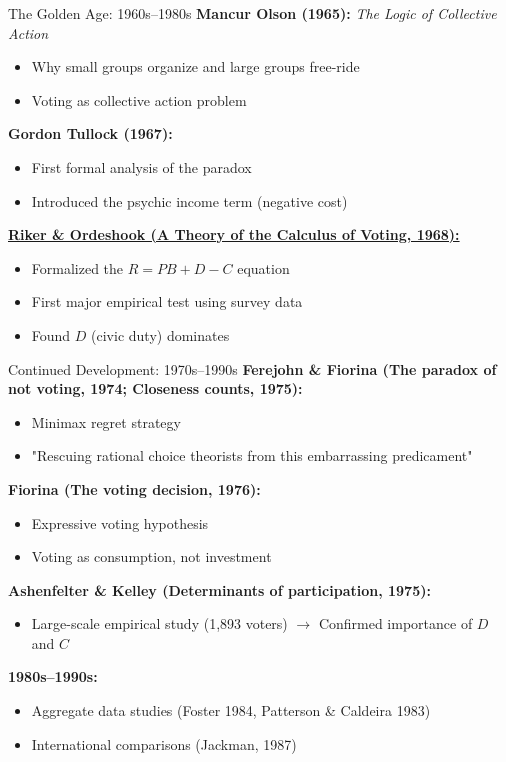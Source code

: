 \documentclass[10pt]{beamer}
\begin{document}
\begin{frame}{The Golden Age: 1960s--1980s}
\textbf{Mancur Olson (1965):} \emph{The Logic of Collective Action}
\begin{itemize}
\item Why small groups organize and large groups free-ride
\item Voting as collective action problem
\end{itemize}


\textbf{Gordon Tullock (1967):}
\begin{itemize}
\item First formal analysis of the paradox
\item Introduced the psychic income term (negative cost)
\end{itemize}

\href{https://www.cambridge.org/core/journals/american-political-science-review/article/theory-of-the-calculus-of-voting/500608E51991E92AC96EB6860F1192CA}{\textbf{Riker \& Ordeshook (A Theory of the Calculus of Voting, 1968):}}

\begin{itemize}
\item Formalized the $R = PB + D - C$ equation
\item First major empirical test using survey data
\item Found $D$ (civic duty) dominates
\end{itemize}
\end{frame}

\begin{frame}{Continued Development: 1970s--1990s}
\textbf{Ferejohn \& Fiorina (The paradox of not voting, 1974; Closeness counts, 1975):}
\begin{itemize}
\item Minimax regret strategy
\item "Rescuing rational choice theorists from this embarrassing predicament"
\end{itemize}

\textbf{Fiorina (The voting decision, 1976):}
\begin{itemize}
\item Expressive voting hypothesis
\item Voting as consumption, not investment
\end{itemize}


\textbf{Ashenfelter \& Kelley (Determinants of participation, 1975):}
\begin{itemize}
\item Large-scale empirical study (1,893 voters) $\rightarrow$ Confirmed importance of $D$ and $C$
\end{itemize}


\textbf{1980s--1990s:}
\begin{itemize}
\item Aggregate data studies (Foster 1984, Patterson \& Caldeira 1983)
\item International comparisons (Jackman, 1987)
\end{itemize}
\end{frame}
\end{document}
